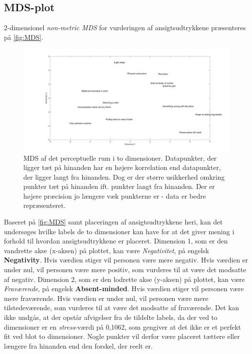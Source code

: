 \subsection*{MDS-plot}
2-dimensionel \textit{non-metric MDS} for vurderingen af ansigtsudtrykkene præsenteres på \autoref{fig:MDS}.  
%
\begin{figure}[H]
\centering
\includegraphics[width =\textwidth]{Figure/MDS_plot} 
\caption{MDS af det perceptuelle rum i to dimensioner. Datapunkter, der ligger tæt på hinanden har en højere korrelation end datapunkter, der ligger langt fra hinanden. Dog er der større usikkerhed omkring punkter tæt på hinanden ift. punkter langt fra hinanden. Der er højere præcision jo længere væk punkterne er - data er bedre repræsenteret.}
\label{fig:MDS}
\end{figure}
\noindent
%
Baseret på \autoref{fig:MDS} samt placeringen af ansigtsudtrykkene heri, kan det undersøges hvilke labels de to dimensioner kan have for at det giver mening i forhold til hvordan ansigtsudtrykkene er placeret.\blankline 
%
Dimension 1, som er den vandrette akse (x-aksen) på plottet, kan være \textit{Negativitet}, på engelsk \textbf{Negativity}. Hvis værdien stiger vil personen være mere negativ. Hvis værdien er under nul, vil personen være mere positiv, som vurderes til at være det modsatte af negativ.\blankline
%
Dimension 2, som er den lodrette akse (y-aksen) på plottet, kan være \textit{Fraværende}, på engelsk \textbf{Absent-minded}. Hvis værdien stiger vil personen være mere fraværende. Hvis værdien er under nul, vil personen være mere tilstedeværende, som vurderes til at være det modsatte af fraværende. \blankline
%
Det kan ikke undgås, at der opstår afvigelser fra de tildelte labels, da der ved to dimensioner er en \textit{stress}-værdi på 0,1062, som gengiver at det ikke er et perfekt fit ved blot to dimensioner. Nogle punkter vil derfor være placeret tættere eller længere fra hinanden end den forskel, der reelt er.\blankline
